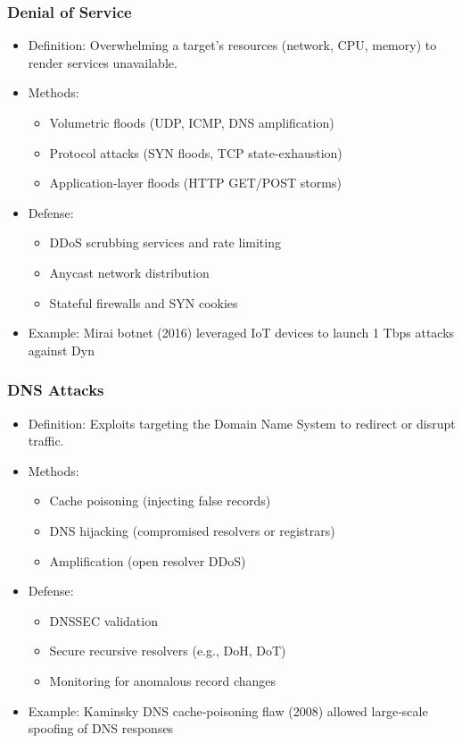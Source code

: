 \documentclass[11pt]{article}
\begin{document}
\subsubsection{Denial of Service}
\label{sec:orge18f5ad}
\begin{itemize}
\item Definition: Overwhelming a target’s resources (network, CPU, memory) to render services unavailable.
\item Methods:
\begin{itemize}
\item Volumetric floods (UDP, ICMP, DNS amplification)
\item Protocol attacks (SYN floods, TCP state‑exhaustion)
\item Application‑layer floods (HTTP GET/POST storms)
\end{itemize}
\item Defense:
\begin{itemize}
\item DDoS scrubbing services and rate limiting
\item Anycast network distribution
\item Stateful firewalls and SYN cookies
\end{itemize}
\item Example: Mirai botnet (2016) leveraged IoT devices to launch 1 Tbps attacks against Dyn
\end{itemize}
\subsubsection{DNS Attacks}
\label{sec:org936ad67}
\begin{itemize}
\item Definition: Exploits targeting the Domain Name System to redirect or disrupt traffic.
\item Methods:
\begin{itemize}
\item Cache poisoning (injecting false records)
\item DNS hijacking (compromised resolvers or registrars)
\item Amplification (open resolver DDoS)
\end{itemize}
\item Defense:
\begin{itemize}
\item DNSSEC validation
\item Secure recursive resolvers (e.g., DoH, DoT)
\item Monitoring for anomalous record changes
\end{itemize}
\item Example: Kaminsky DNS cache‑poisoning flaw (2008) allowed large‐scale spoofing of DNS responses
\end{itemize}
\end{document}
